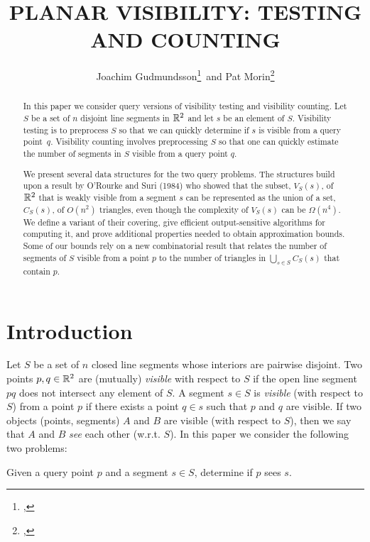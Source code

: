 \documentclass{patmorin}
\title{\MakeUppercase{Planar Visibility: Testing and Counting}}
\author{Joachim Gudmundsson\thanks{\affil{NICTA},
\email{joachim.gudmundsson@nicta.com.au}}\,
       and Pat Morin\thanks{\affil{Carleton University},
\email{morin@scs.carleton.ca}}}
\begin{document}
\maketitle
\begin{abstract}
In this paper we consider query versions of visibility testing and
visibility counting. Let $S$ be a set of $n$ disjoint line segments
in $\mathbb{R}^2$ and let $s$ be an element of $S$. Visibility testing is
to preprocess $S$ so that we can quickly determine if $s$ is visible
from a query point~$q$. Visibility counting involves preprocessing $S$
so that one can quickly estimate the number of segments in $S$ visible
from a query point $q$.

We present several data structures for the two query problems. The
structures build upon a result by O'Rourke and Suri (1984) who showed that
the subset, $V_S(s)$, of $\mathbb{R}^2$ that is weakly visible from a segment $s$
can be represented as the union of a set, $C_S(s)$, of $O(n^2)$ triangles,
even though the complexity of $V_S(s)$ can be $\Omega(n^4)$. We define
a variant of their covering, give efficient output-sensitive algorithms
for computing it, and prove additional properties needed to obtain
approximation bounds. Some of our bounds rely on a new combinatorial
result that relates the number of segments of $S$ visible from a point $p$
to the number of triangles in $\bigcup_{s\in S} C_S(s)$ that contain $p$.
\end{abstract}


\section{Introduction}

Let $S$ be a set of $n$ closed line segments whose interiors are pairwise
disjoint.  Two points $p,q\in\mathbb{R}^2$ are (mutually) \emph{visible} with
respect to $S$ if the open line segment $pq$ does not intersect any
element of $S$.  A segment $s\in S$ is \emph{visible} (with respect to
$S$) from a point $p$ if there exists a point $q\in s$ such that $p$
and $q$ are visible.  If two objects (points, segments) $A$ and $B$ are
visible (with respect to $S$), then we say that $A$ and $B$ \emph{see}
each other (w.r.t. $S$).  In this paper we consider the following two
problems:

\begin{prb}
  Given a query point $p$ and a segment $s\in S$, determine if $p$
  sees $s$.
\end{prb}
\end{document}
